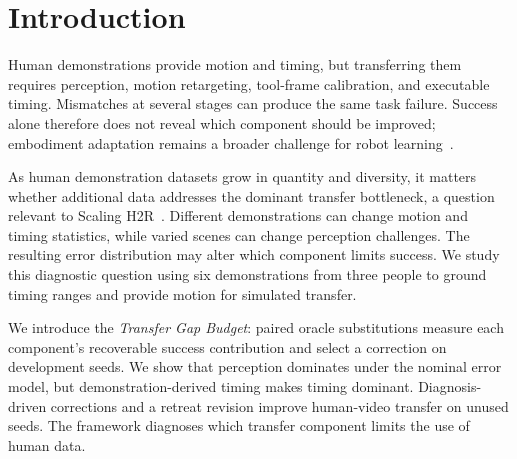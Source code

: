 
\begin{abstract}
Human-to-robot transfer combines perception, retargeting, calibration, and execution timing, making task failures difficult to attribute. We introduce the \emph{Transfer Gap Budget}, a paired oracle-intervention framework that estimates each component's recoverable contribution to success and selects targeted corrections. Across UR5e and UR10e simulations, perception dominates under the nominal error model, recovering approximately 30 percentage points. However, setting timing perturbations to span speeds measured in six human demonstrations makes timing dominant. The diagnosis is thus conditional on the transfer-error distribution. On human-video demonstrations, diagnosis-driven corrections and a revised retreat improve success on unused seeds; the notebook example rises from 0/60 to 60/60 on both arms. These findings motivate measuring demonstration-associated errors when choosing which transfer component to improve. All robot evaluations are in simulation.
\end{abstract}

\section{Introduction}

Human demonstrations provide motion and timing, but transferring them requires perception, motion retargeting, tool-frame calibration, and executable timing. Mismatches at several stages can produce the same task failure. Success alone therefore does not reveal which component should be improved; embodiment adaptation remains a broader challenge for robot learning~\citep{domae2026embodimentgap}.

As human demonstration datasets grow in quantity and diversity, it matters whether additional data addresses the dominant transfer bottleneck, a question relevant to Scaling H2R~\citep{scalingh2r}. Different demonstrations can change motion and timing statistics, while varied scenes can change perception challenges. The resulting error distribution may alter which component limits success. We study this diagnostic question using six demonstrations from three people to ground timing ranges and provide motion for simulated transfer.

We introduce the \emph{Transfer Gap Budget}: paired oracle substitutions measure each component's recoverable success contribution and select a correction on development seeds. We show that perception dominates under the nominal error model, but demonstration-derived timing makes timing dominant. Diagnosis-driven corrections and a retreat revision improve human-video transfer on unused seeds. The framework diagnoses which transfer component limits the use of human data.

